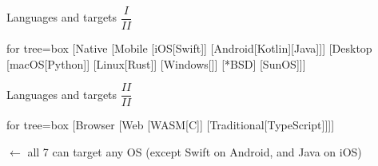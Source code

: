 \documentclass[aspectratio=169,xcolor=dvipsnames]{beamer}
\begin{document}
\begin{frame}{Languages and targets \(\dfrac{I}{II}\)}
	\begin{forest}
		for tree={box} [Native
			[Mobile
					[iOS[Swift]]
					[Android[Kotlin][Java]]]
			[Desktop
					[macOS[Python]]
					[Linux[Rust]]
					[Windows[\textellipsis{}]]
					[*BSD]
					[SunOS]]]
	\end{forest}
\end{frame}

\begin{frame}{Languages and targets \(\dfrac{II}{II}\)}
	\begin{forest}
		for tree={box} [Browser
			[Web
					[WASM[C]]
					[Traditional[TypeScript]]]]
	\end{forest}
	\(\leftarrow\) all 7 can target any OS (except Swift on Android, and Java on iOS)
\end{frame}
\end{document}
